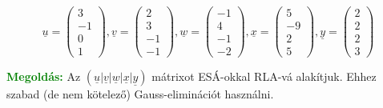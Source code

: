 \documentclass[../szamtud.tex]{subfiles}
\begin{document}
        \[
            \underline{u} = \begin{pmatrix}
                3 \\
                -1 \\
                0 \\ 
                1 
            \end{pmatrix}, \underline{v} = 
            \begin{pmatrix}
                2 \\
                3 \\
                -1 \\
                -1 
            \end{pmatrix}, \underline{w} = 
            \begin{pmatrix}
                -1 \\
                4 \\
                -1 \\
                -2
            \end{pmatrix}, \underline{x} = 
            \begin{pmatrix}
                5 \\
                -9 \\
                2 \\
                5
            \end{pmatrix}, \underline{y} = 
            \begin{pmatrix}
                2 \\
                2 \\
                2 \\
                3
            \end{pmatrix}
        \]

        \textcolor{green}{\textbf{Megoldás:}} Az $(\underline{u}|\underline{v}|\underline{w}|\underline{x}|\underline{y})$ mátrixot ESÁ-okkal RLA-vá alakítjuk. Ehhez szabad (de nem kötelező) Gauss-eliminációt használni.
\end{document}
